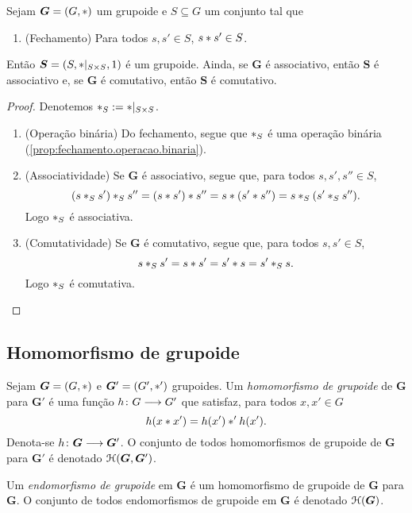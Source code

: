 \begin{proposition}
\label{prop:propriedade.subgrupoide}
Sejam $\bm G=(G,\ast)$ um grupoide e $S \subseteq G$ um conjunto tal que
	\begin{enumerate}[label=\textbf{SM\arabic*.},ref={SM\arabic*}]
	\item (Fechamento) Para todos $s,s' \in S$, $s \ast s' \in S$.
	\end{enumerate}
\noindent
Então $\bm S=(S,\ast|_{S \times S},1)$ é um grupoide. Ainda, se $\bm G$ é associativo, então $\bm S$ é associativo e, se $\bm G$ é comutativo, então $\bm S$ é comutativo.
\end{proposition}
\begin{proof}
Denotemos $\ast_S :=  \ast|_{S \times S}$.
	\begin{enumerate}
	\item (Operação binária) Do fechamento, segue que $\ast_S$ é uma operação binária (\ref{prop:fechamento.operacao.binaria}).

	\item (Associatividade) Se $\bm G$ é associativo, segue que, para todos $s,s',s'' \in S$,
		\begin{equation*}
		(s \ast_S s') \ast_S s'' = (s \ast s') \ast s'' = s \ast (s' \ast s'') = s \ast_S (s' \ast_S s'').
		\end{equation*}
	Logo $\ast_S$ é associativa.

	\item (Comutatividade) Se $\bm G$ é comutativo, segue que, para todos $s,s' \in S$,
		\begin{equation*}
		s \ast_S s' = s \ast s' = s' \ast s = s' \ast_S s.
		\end{equation*}
	Logo $\ast_S$ é comutativa.
	\qedhere
	\end{enumerate}
\end{proof}

\subsection{Homomorfismo de grupoide}

\begin{definition}
Sejam $\bm G=(G,\ast)$ e $\bm G'=(G',\ast')$ grupoides. Um \emph{homomorfismo de grupoide} de $\bm G$ para $\bm G'$ é uma função ${h}\colon {G} \longrightarrow {G'}$ que satisfaz, para todos $x,x' \in G$
	\begin{equation*}
	h(x \ast x')=h(x') \ast' h(x').
	\end{equation*}
Denota-se ${h}\colon {\bm G} \longrightarrow {\bm G'}$.
O conjunto de todos homomorfismos de grupoide de $\bm G$ para $\bm G'$ é denotado $\mathcal{H}(\bm G,\bm G')$.

Um \emph{endomorfismo de grupoide} em $\bm G$ é um homomorfismo de grupoide de $\bm G$ para $\bm G$. O conjunto de todos endomorfismos de grupoide em $\bm G$ é denotado $\mathcal{H}(\bm G)$.
\end{definition}

